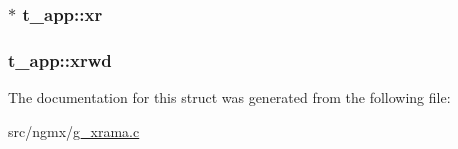 \hypertarget{structt__app_ae5e277e0165214fe49cced71b0e76fa8}{
\subsubsection[{xr}]{$\ast$ {\bf t\-\_\-app\-::xr}}}\label{structt__app_ae5e277e0165214fe49cced71b0e76fa8}
\hypertarget{structt__app_af7a64990f5dd04b880cb6d740395c8f9}{
\subsubsection[{xrwd}]{ {\bf t\-\_\-app\-::xrwd}}}\label{structt__app_af7a64990f5dd04b880cb6d740395c8f9}


\-The documentation for this struct was generated from the following file\-:\begin{DoxyCompactItemize}
\item 
src/ngmx/\hyperlink{g__xrama_8c}{g\-\_\-xrama.\-c}\end{DoxyCompactItemize}
